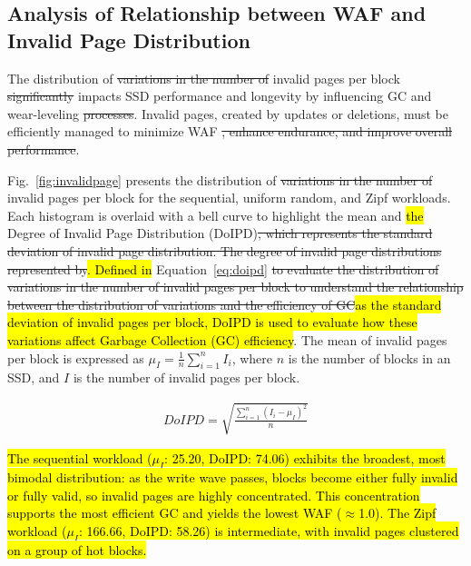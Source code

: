 \documentclass{ieeeaccess}
\begin{document}
\subsection{Analysis of Relationship between WAF and Invalid Page Distribution}
\label{subsec:InvalidPagesPatterns}


The distribution of \sout{variations in the number of} invalid pages per block \sout{significantly} impacts SSD performance and longevity by influencing GC and wear-leveling \sout{processes}. Invalid pages, created by updates or deletions, must be efficiently managed to minimize WAF \sout{, enhance endurance, and improve overall performance}.

Fig.~\ref{fig:invalidpage} presents the distribution of \sout{variations in the number of} invalid pages per block for the sequential, uniform random, and Zipf workloads. Each histogram is overlaid with a bell curve to highlight the mean and \hl{the} Degree of Invalid Page Distribution (DoIPD)\sout{, which represents the standard deviation of invalid page distribution. The degree of invalid page distributions represented by}\hl{. Defined in} Equation~\ref{eq:doipd} \sout{to evaluate the distribution of variations in the number of invalid pages per block to understand the relationship between the distribution of variations and the efficiency of GC}\hl{as the standard deviation of invalid pages per block, DoIPD is used to evaluate how these variations affect Garbage Collection (GC) efficiency}. The mean of invalid pages per block is expressed as $\mu_I=\frac{1}{n} \sum_{i=1}^{n} I_i$, where $n$ is the number of blocks in an SSD, and $I$ is the number of invalid pages per block.

\begin{align}
DoIPD =\sqrt{\frac{\sum_{i=1}^{n}(I_i - \mu_I)^2}{n}}
\label{eq:doipd}
\end{align}

\hl{The sequential workload ($\mu_I$: 25.20, DoIPD: 74.06) exhibits the broadest, most bimodal distribution: as the write wave passes, blocks become either fully invalid or fully valid, so invalid pages are highly concentrated. This concentration supports the most efficient GC and yields the lowest WAF ($\approx$1.0). The Zipf workload ($\mu_I$: 166.66, DoIPD: 58.26) is intermediate, with invalid pages clustered on a group of hot blocks.}
\end{document}
